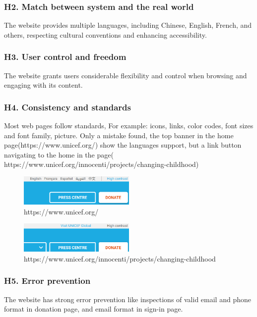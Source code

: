 \subsubsection{H2. Match between system and the real world}
The website provides multiple languages, including Chinese, English, French, and others, respecting cultural conventions and enhancing accessibility.

\subsubsection{H3. User control and freedom }
The website grants users considerable flexibility and control when browsing and engaging with its content.

\subsubsection{H4. Consistency and standards}
Most web pages follow standards, For example: icons, links, color codes, font sizes and font family, picture. 
Only a mistake found, the top banner in the home page(https://www.unicef.org/) show the languages support, but a link button navigating to the home in the page( https://www.unicef.org/innocenti/projects/changing-childhood)
\begin{figure}[h]
	\centering
	\includegraphics[width=0.5\textwidth]{Images/yan_h4_1.png}
	\caption{https://www.unicef.org/}
	\label{fig:h4_1}
\end{figure}
\begin{figure}[h]
	\centering
	\includegraphics[width=0.5\textwidth]{Images/yan_h4_2.png}
	\caption{https://www.unicef.org/innocenti/projects/changing-childhood}
	\label{fig:h4_2}
\end{figure}

\subsubsection{H5. Error prevention }
The website has strong error prevention like inspections of valid email and phone format in donation page, and email format in sign-in page. 

